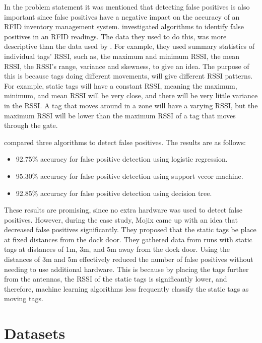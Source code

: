 \documentclass{article}
\begin{document}
In the problem statement it was mentioned that detecting false positives is also important since false positives have a negative impact on the accuracy of an \ac{RFID} inventory management system.
\citet{ref:Ma} investigated algorithms to identify false positives in an \ac{RFID} readings.
The data they used to do this, was more descriptive than the data used by \citet{ref:Alfian}. 
For example, they used summary statistics of individual tags' \ac{RSSI}, such as, the maximum and minimum \ac{RSSI}, the mean \ac{RSSI}, the \ac{RSSI}'s range, variance and skewness, to give an idea.
The purpose of this is because tags doing different movements, will give different \ac{RSSI} patterns.
For example, static tags will have a constant \ac{RSSI}, meaning the maximum, minimum, and mean \ac{RSSI} will be very close, and there will be very little variance in the \ac{RSSI}.
A tag that moves around in a zone will have a varying \ac{RSSI}, but the maximum \ac{RSSI} will be lower than the maximum \ac{RSSI} of a tag that moves through the gate.

\citet{ref:Ma} compared three algorithms to detect false positives.
The results are as follows:
\begin{itemize}
    \item 92.75\% accuracy for false positive detection using logistic regression.
    \item 95.30\% accuracy for false positive detection using support vecor machine.
    \item 92.85\% accuracy for false positive detection using decision tree.
\end{itemize}
These results are promising, since no extra hardware was used to detect false positives.
However, during the case study, Mojix came up with an idea that decreased false positives significantly.
They proposed that the static tags be place at fixed distances from the dock door.
They gathered data from runs with static tags at distances of 1m, 3m, and 5m away from the dock door.
Using the distances of 3m and 5m effectively reduced the number of false positives without needing to use additional hardware.
This is because by placing the tags further from the antennas, the \ac{RSSI} of the static tags is significantly lower, and therefore, machine learning algorithms less frequently classify the static tags as moving tags.

\section{Datasets}
\end{document}
